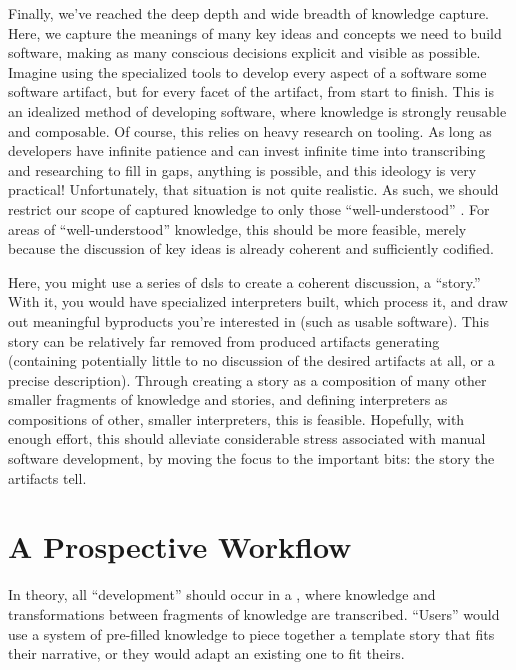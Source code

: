 Finally, we've reached the deep depth and wide breadth of knowledge capture.
Here, we capture the meanings of many key ideas and concepts we need to build
software, making as many conscious decisions explicit and visible as possible.
Imagine using the specialized tools to develop every aspect of a software some
software artifact, but for every facet of the artifact, from start to finish.
This is an idealized method of developing software, where knowledge is strongly
reusable and composable. Of course, this relies on heavy research on tooling. As
long as developers have infinite patience and can invest infinite time into
transcribing and researching to fill in gaps, anything is possible, and this
ideology is very practical! Unfortunately, that situation is not quite
realistic. As such, we should restrict our scope of captured knowledge to only
those ``well-understood'' \cite{well-understood}. For areas of
``well-understood'' knowledge, this should be more feasible, merely because the
discussion of key ideas is already coherent and sufficiently codified.

Here, you might use a series of \aclp{dsl} to create a coherent discussion, a
``story.'' With it, you would have specialized interpreters built, which process
it, and draw out meaningful byproducts you're interested in (such as usable
software). This story can be relatively far removed from produced artifacts
generating (containing potentially little to no discussion of the desired
artifacts at all, or a precise description). Through creating a story as a
composition of many other smaller fragments of knowledge and stories, and
defining interpreters as compositions of other, smaller interpreters, this is
feasible. Hopefully, with enough effort, this should alleviate considerable
stress associated with manual software development, by moving the focus to the
important bits: the story the artifacts tell.

\section{A Prospective Workflow}
\label{chap:ideology:sec:a_prospective_workflow}

In theory, all ``development'' should occur in a , where knowledge and
transformations between fragments of knowledge are transcribed. ``Users'' would
use a system of pre-filled knowledge to piece together a template story that
fits their narrative, or they would adapt an existing one to fit theirs.


